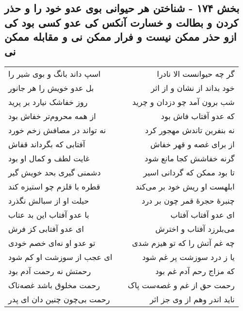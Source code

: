 \begin{center}
\section*{بخش ۱۷۴ - شناختن هر حیوانی بوی عدو خود را و حذر کردن و بطالت و خسارت آنکس کی عدو کسی بود کی ازو حذر ممکن نیست و فرار ممکن نی و مقابله ممکن نی}
\label{sec:sh174}
\begin{longtable}{l p{0.5cm} r}
اسپ داند بانگ و بوی شیر را
&&
گر چه حیوانست الا نادرا
\\
بل عدو خویش را هر جانور
&&
خود بداند از نشان و از اثر
\\
روز خفاشک نیارد بر پرید
&&
شب برون آمد چو دزدان و چرید
\\
از همه محروم‌تر خفاش بود
&&
که عدو آفتاب فاش بود
\\
نه تواند در مصافش زخم خورد
&&
نه بنفرین تاندش مهجور کرد
\\
آفتابی که بگرداند قفاش
&&
از برای غصه و قهر خفاش
\\
غایت لطف و کمال او بود
&&
گرنه خفاشش کجا مانع شود
\\
دشمنی گیری بحد خویش گیر
&&
تا بود ممکن که گردانی اسیر
\\
قطره با قلزم چو استیزه کند
&&
ابلهست او ریش خود بر می‌کند
\\
حیلت او از سبالش نگذرد
&&
چنبرهٔ حجرهٔ قمر چون بر درد
\\
با عدو آفتاب این بد عتاب
&&
ای عدو آفتاب آفتاب
\\
ای عدو آفتابی کز فرش
&&
می‌بلرزد آفتاب و اخترش
\\
تو عدو او نه‌ای خصم خودی
&&
چه غم آتش را که تو هیزم شدی
\\
ای عجب از سوزشت او کم شود
&&
یا ز درد سوزشت پر غم شود
\\
رحمتش نه رحمت آدم بود
&&
که مزاج رحم آدم غم بود
\\
رحمت مخلوق باشد غصه‌ناک
&&
رحمت حق از غم و غصه‌ست پاک
\\
رحمت بی‌چون چنین دان ای پدر
&&
ناید اندر وهم از وی جز اثر
\\
\end{longtable}
\end{center}
